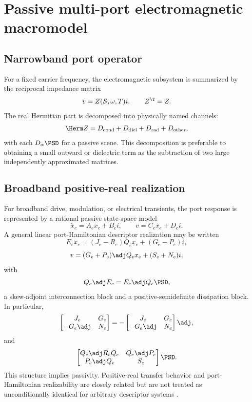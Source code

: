 \section{Passive multi-port electromagnetic macromodel}
\label{sec:port-macro}

\subsection{Narrowband port operator}

For a fixed carrier frequency, the electromagnetic subsystem is summarized by
the reciprocal impedance matrix
\[
  v=Z(\mathcal S,\omega,T)i,\qquad Z^\T=Z .
\]
The real Hermitian part is decomposed into physically named channels:
\[
  \Herm Z
  =D_{\mathrm{cond}}
   +D_{\mathrm{diel}}
   +D_{\mathrm{rad}}
   +D_{\mathrm{other}},
\]
with each $D_\alpha\PSD$ for a passive scene. This decomposition is preferable
to obtaining a small outward or dielectric term as the subtraction of two large
independently approximated matrices.

\subsection{Broadband positive-real realization}

For broadband drive, modulation, or electrical transients, the port response is
represented by a rational passive state-space model
\[
 \dot x_e=A_e x_e+B_e i,\qquad
 v=C_e x_e+D_e i.
\]
A general linear port-Hamiltonian descriptor realization may be written
\cite{cherifi2024phpassive}
\[
 E_e\dot x_e
 =
 (J_e-R_e)Q_e x_e+(G_e-P_e)i,
\]
\[
 v
 =
 (G_e+P_e)\adj Q_e x_e+(S_e+N_e)i,
\]
with
\[
 Q_e\adj E_e=E_e\adj Q_e\PSD,
\]
a skew-adjoint interconnection block and a positive-semidefinite dissipation
block. In particular,
\[
 \begin{bmatrix}
 J_e&G_e\\
 -G_e\adj&N_e
 \end{bmatrix}
 =
 -
 \begin{bmatrix}
 J_e&G_e\\
 -G_e\adj&N_e
 \end{bmatrix}\adj,
\]
and
\[
 \begin{bmatrix}
 Q_e\adj R_eQ_e&Q_e\adj P_e\\
 P_e\adj Q_e&S_e
 \end{bmatrix}
 \PSD.
\]
This structure implies passivity. Positive-real transfer behavior and
port-Hamiltonian realizability are closely related but are not treated as
unconditionally identical for arbitrary descriptor systems
\cite{cherifi2024phpassive}.


